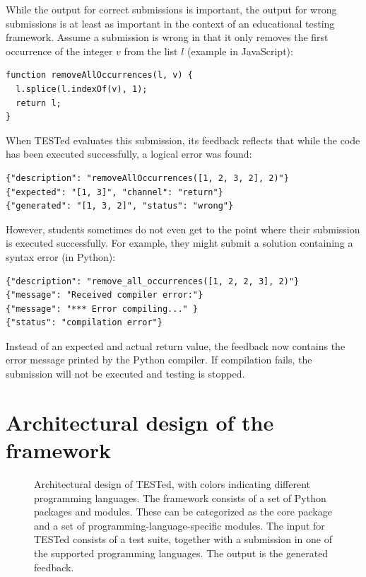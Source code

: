 \documentclass[../main]{subfiles}
\begin{document}
While the output for correct submissions is important, the output for wrong submissions is at least as important in the context of an educational testing framework.
Assume a submission is wrong in that it only removes the first occurrence of the integer $v$ from the list $l$ (example in JavaScript):

\begin{verbatim}
function removeAllOccurrences(l, v) {
  l.splice(l.indexOf(v), 1);
  return l;
}
\end{verbatim}

When TESTed evaluates this submission, its feedback reflects that while the code has been executed successfully, a logical error was found:

\begin{verbatim}
{"description": "removeAllOccurrences([1, 2, 3, 2], 2)"}
{"expected": "[1, 3]", "channel": "return"}
{"generated": "[1, 3, 2]", "status": "wrong"}
\end{verbatim}

However, students sometimes do not even get to the point where their submission is executed successfully.
For example, they might submit a solution containing a syntax error (in Python):

\begin{verbatim}
{"description": "remove_all_occurrences([1, 2, 2, 3], 2)"}
{"message": "Received compiler error:"}
{"message": "*** Error compiling..." }
{"status": "compilation error"}
\end{verbatim}

Instead of an expected and actual return value, the feedback now contains the error message printed by the Python compiler.
If compilation fails, the submission will not be executed and testing is stopped.

\section{Architectural design of the framework}\label{sec:tested1-architectural-design}

\begin{figure}
    \centering
    
    \caption{
        Architectural design of TESTed, with colors indicating different programming languages.
        The framework consists of a set of Python packages and modules.
        These can be categorized as the core package and a set of programming-language-specific modules.
        The input for TESTed consists of a test suite, together with a submission in one of the supported programming languages.
        The output is the generated feedback.
    }
    \label{fig:conceptual-design}
\end{figure}
\end{document}
